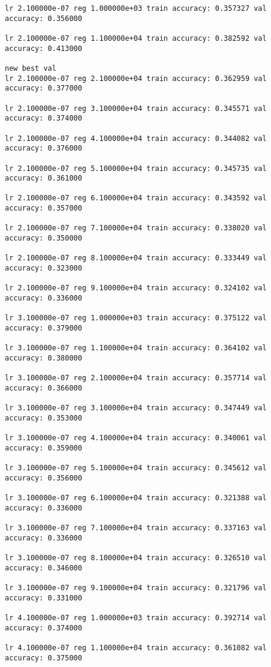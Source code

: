 \documentclass[11pt]{article}
\begin{document}
\begin{Verbatim}[commandchars=\\\{\}]
lr 2.100000e-07 reg 1.000000e+03 train accuracy: 0.357327 val accuracy: 0.356000

lr 2.100000e-07 reg 1.100000e+04 train accuracy: 0.382592 val accuracy: 0.413000

new best val
lr 2.100000e-07 reg 2.100000e+04 train accuracy: 0.362959 val accuracy: 0.377000

lr 2.100000e-07 reg 3.100000e+04 train accuracy: 0.345571 val accuracy: 0.374000

lr 2.100000e-07 reg 4.100000e+04 train accuracy: 0.344082 val accuracy: 0.376000

lr 2.100000e-07 reg 5.100000e+04 train accuracy: 0.345735 val accuracy: 0.361000

lr 2.100000e-07 reg 6.100000e+04 train accuracy: 0.343592 val accuracy: 0.357000

lr 2.100000e-07 reg 7.100000e+04 train accuracy: 0.338020 val accuracy: 0.350000

lr 2.100000e-07 reg 8.100000e+04 train accuracy: 0.333449 val accuracy: 0.323000

lr 2.100000e-07 reg 9.100000e+04 train accuracy: 0.324102 val accuracy: 0.336000

lr 3.100000e-07 reg 1.000000e+03 train accuracy: 0.375122 val accuracy: 0.379000

lr 3.100000e-07 reg 1.100000e+04 train accuracy: 0.364102 val accuracy: 0.380000

lr 3.100000e-07 reg 2.100000e+04 train accuracy: 0.357714 val accuracy: 0.366000

lr 3.100000e-07 reg 3.100000e+04 train accuracy: 0.347449 val accuracy: 0.353000

lr 3.100000e-07 reg 4.100000e+04 train accuracy: 0.340061 val accuracy: 0.359000

lr 3.100000e-07 reg 5.100000e+04 train accuracy: 0.345612 val accuracy: 0.356000

lr 3.100000e-07 reg 6.100000e+04 train accuracy: 0.321388 val accuracy: 0.336000

lr 3.100000e-07 reg 7.100000e+04 train accuracy: 0.337163 val accuracy: 0.336000

lr 3.100000e-07 reg 8.100000e+04 train accuracy: 0.326510 val accuracy: 0.346000

lr 3.100000e-07 reg 9.100000e+04 train accuracy: 0.321796 val accuracy: 0.331000

lr 4.100000e-07 reg 1.000000e+03 train accuracy: 0.392714 val accuracy: 0.374000

lr 4.100000e-07 reg 1.100000e+04 train accuracy: 0.361082 val accuracy: 0.375000


\end{Verbatim}
\end{document}
